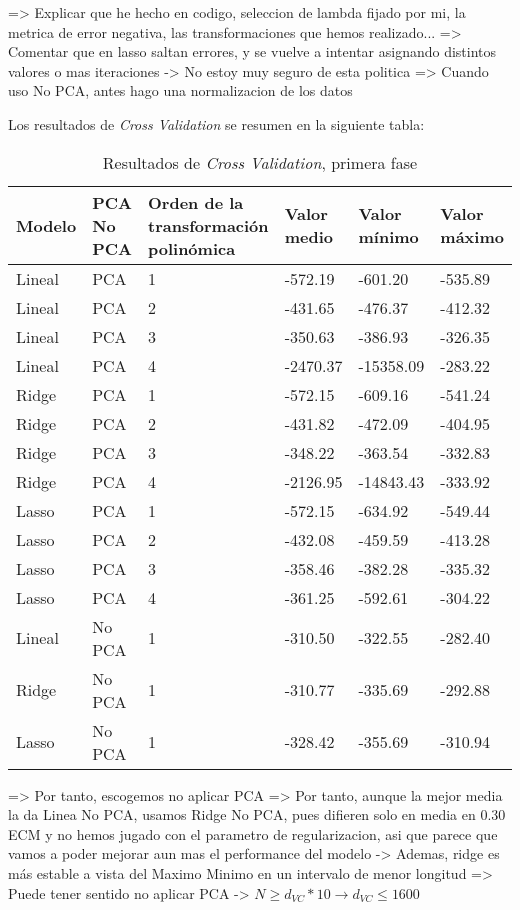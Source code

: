 \documentclass[11pt]{article}
\begin{document}
=> Explicar que he hecho en codigo, seleccion de lambda fijado por mi, la metrica de error negativa, las transformaciones que hemos realizado...
=> Comentar que en lasso saltan errores, y se vuelve a intentar asignando distintos valores o mas iteraciones -> No estoy muy seguro de esta politica
=> Cuando uso No PCA, antes hago una normalizacion de los datos

Los resultados de \emph{Cross Validation} se resumen en la siguiente tabla:

\begin{table}[H]
\begin{tabularx}{\textwidth}{|X|X|X|X|X|X|}
    \hline
    \textbf{Modelo} & \textbf{PCA \/ No PCA}& \textbf{Orden de la transformación polinómica} & \textbf{Valor medio} & \textbf{Valor mínimo} & \textbf{Valor máximo} \\
    \hline
    Lineal & PCA & 1 & -572.19 & -601.20 & -535.89 \\
    Lineal & PCA & 2 & -431.65 &-476.37 & -412.32 \\
    Lineal & PCA & 3 &-350.63 &-386.93 & -326.35 \\
    Lineal & PCA & 4 & -2470.37 &-15358.09 & -283.22 \\
    Ridge  & PCA & 1 &-572.15 &-609.16 & -541.24 \\
    Ridge  & PCA & 2 & -431.82 &-472.09 & -404.95 \\
    Ridge  & PCA & 3 & -348.22 &-363.54 & -332.83 \\
    Ridge  & PCA & 4 & -2126.95 &-14843.43 & -333.92 \\
    Lasso  & PCA & 1 & -572.15 &-634.92 & -549.44 \\
    Lasso  & PCA & 2 & -432.08 &-459.59 & -413.28 \\
    Lasso  & PCA & 3 & -358.46 &-382.28 & -335.32 \\
    Lasso  & PCA & 4 & -361.25 &-592.61 & -304.22 \\
    Lineal & No PCA & 1 & -310.50 &-322.55 & -282.40 \\
    Ridge  & No PCA & 1 & -310.77 &-335.69 & -292.88 \\
    Lasso  & No PCA & 1 & -328.42 &-355.69 & -310.94 \\
    \hline
\end{tabularx}
    \caption{Resultados de \emph{Cross Validation}, primera fase}
\end{table}

=> Por tanto, escogemos no aplicar PCA
=> Por tanto, aunque la mejor media la da Linea No PCA, usamos Ridge No PCA, pues difieren solo en media en 0.30 ECM y no hemos jugado con el parametro de regularizacion, asi que parece que vamos a poder mejorar aun mas el performance del modelo
    -> Ademas, ridge es más estable a vista del Maximo Minimo en un intervalo de menor longitud
=> Puede tener sentido no aplicar PCA -> $N \geq d_{VC} * 10 \rightarrow d_{VC} \leq 1600$
\end{document}
